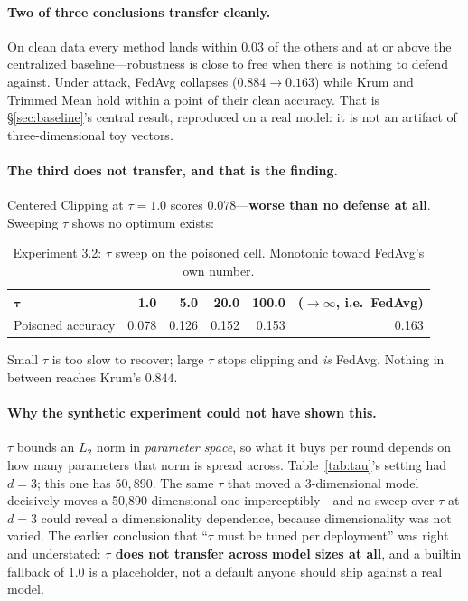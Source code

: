 \documentclass[11pt,a4paper]{article}
\begin{document}
\paragraph{Two of three conclusions transfer cleanly.} On clean data every
method lands within $0.03$ of the others and at or above the centralized
baseline---robustness is close to free when there is nothing to defend
against. Under attack, FedAvg collapses ($0.884 \rightarrow 0.163$) while
Krum and Trimmed Mean hold within a point of their clean accuracy. That is
\S\ref{sec:baseline}'s central result, reproduced on a real model: it is
not an artifact of three-dimensional toy vectors.

\paragraph{The third does not transfer, and that is the finding.}
Centered Clipping at $\tau = 1.0$ scores $0.078$---\textbf{worse than no
defense at all}. Sweeping $\tau$ shows no optimum exists:

\begin{table}[htbp]
\centering
\small
\caption{Experiment 3.2: $\tau$ sweep on the poisoned cell. Monotonic
toward FedAvg's own number.}
\label{tab:tausweep}
\begin{tabular}{lrrrrr}
\toprule
$\boldsymbol{\tau}$ & 1.0 & 5.0 & 20.0 & 100.0 & ($\rightarrow\infty$, i.e.\ FedAvg) \\
\midrule
Poisoned accuracy & 0.078 & 0.126 & 0.152 & 0.153 & 0.163 \\
\bottomrule
\end{tabular}
\end{table}

Small $\tau$ is too slow to recover; large $\tau$ stops clipping and
\emph{is} FedAvg. Nothing in between reaches Krum's $0.844$.

\paragraph{Why the synthetic experiment could not have shown this.} $\tau$
bounds an $L_2$ norm in \emph{parameter space}, so what it buys per round
depends on how many parameters that norm is spread across.
Table~\ref{tab:tau}'s setting had $d = 3$; this one has $50{,}890$. The
same $\tau$ that moved a 3-dimensional model decisively moves a
50{,}890-dimensional one imperceptibly---and no sweep over $\tau$ at
$d=3$ could reveal a dimensionality dependence, because dimensionality was
not varied. The earlier conclusion that ``$\tau$ must be tuned per
deployment'' was right and understated: \textbf{$\tau$ does not transfer
across model sizes at all}, and a builtin fallback of $1.0$ is a
placeholder, not a default anyone should ship against a real model.
\end{document}
